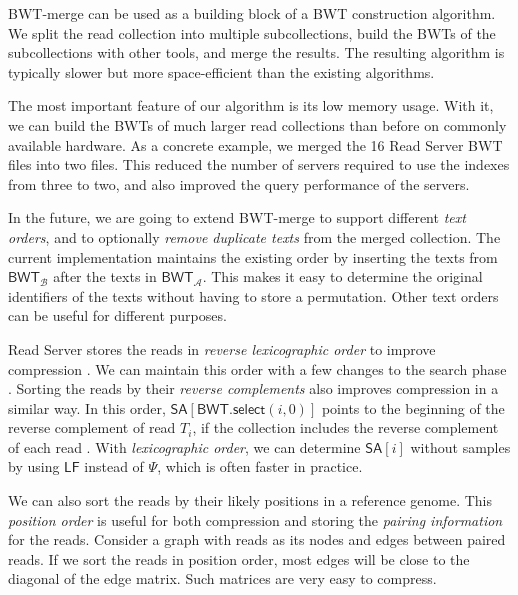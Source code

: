 \documentclass[smallabstract,smallcaptions]{dccpaper}
\newcommand{\BWT}{\textsf{BWT}}
\newcommand{\mSA}{\ensuremath{\mathsf{SA}}}
\newcommand{\mBWT}{\ensuremath{\mathsf{BWT}}}
\newcommand{\mLF}{\ensuremath{\mathsf{LF}}}
\newcommand{\mselect}{\ensuremath{\mathsf{select}}}
\newcommand{\Acoll}{\ensuremath{\mathcal{A}}}
\newcommand{\Bcoll}{\ensuremath{\mathcal{B}}}
\newcommand{\BWTmerge}{\textsf{BWT\nobreakdash-merge}}
\begin{document}
\BWTmerge{} can be used as a building block of a \BWT{} construction algorithm. We split the read collection into multiple subcollections, build the \BWT{}s of the subcollections with other tools, and merge the results. The resulting algorithm is typically slower but more space-efficient than the existing algorithms.

The most important feature of our algorithm is its low memory usage. With it, we can build the \BWT{}s of much larger read collections than before on commonly available hardware. As a concrete example, we merged the 16 Read Server \BWT{} files into two files. This reduced the number of servers required to use the indexes from three to two, and also improved the query performance of the servers.

In the future, we are going to extend \BWTmerge{} to support different \emph{text orders}, and to optionally \emph{remove duplicate texts} from the merged collection. The current implementation maintains the existing order by inserting the texts from $\mBWT_{\Bcoll}$ after the texts in $\mBWT_{\Acoll}$. This makes it easy to determine the original identifiers of the texts without having to store a permutation. Other text orders can be useful for different purposes.

Read Server stores the reads in \emph{reverse lexicographic order} to improve compression \cite{Cox2012}. We can maintain this order with a few changes to the search phase \cite{Li2014a}. Sorting the reads by their \emph{reverse complements} also improves compression in a similar way. In this order, $\mSA[\mBWT.\mselect(i,0)]$ points to the beginning of the reverse complement of read $T_{i}$, if the collection includes the reverse complement of each read \cite{Li2014a}. With \emph{lexicographic order}, we can determine $\mSA[i]$ without samples by using $\mLF$ instead of $\Psi$, which is often faster in practice.

We can also sort the reads by their likely positions in a reference genome. This \emph{position order} is useful for both compression and storing the \emph{pairing information} for the reads. Consider a graph with reads as its nodes and edges between paired reads. If we sort the reads in position order, most edges will be close to the diagonal of the edge matrix. Such matrices are very easy to compress.




\end{document}
